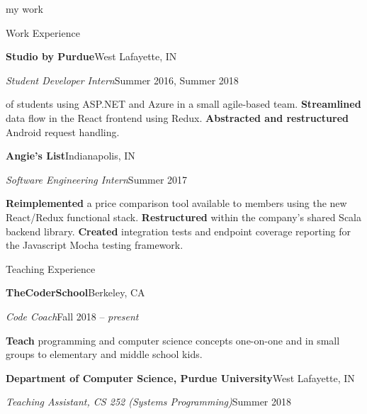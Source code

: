 \hfill\vrule\hfill{}
\begin{minipage}[t]{0.665\textwidth}
  {\Huge my work \phantom{me}}

  \vspace{10pt}

  {\sectionfont Work Experience}

  \vspace{5pt}
  \textbf{Studio by Purdue}\hfill West Lafayette, IN
  \begin{adjustwidth}{10pt}{}
    \emph{Student Developer Intern}\hfill Summer 2016, Summer 2018

     of students using ASP.NET and Azure in a small agile-based team.
    \textbf{Streamlined} data flow in the React frontend using Redux.
    \textbf{Abstracted and restructured} Android request handling.
  \end{adjustwidth}

  \vspace{5pt}
  \textbf{Angie's List}\hfill Indianapolis, IN
  \begin{adjustwidth}{10pt}{}
    \emph{Software Engineering Intern}\hfill Summer 2017

    \textbf{Reimplemented} a price comparison tool available to members using the new React/Redux functional stack.
    \textbf{Restructured}  within the company's shared Scala backend library.
    \textbf{Created} integration tests and endpoint coverage reporting for the Javascript Mocha testing framework.
  \end{adjustwidth}

  \vspace{10pt}

  {\sectionfont Teaching Experience}

  \vspace{5pt}
  \textbf{TheCoderSchool}\hfill Berkeley, CA
  \begin{adjustwidth}{10pt}{}
    \emph{Code Coach}\hfill Fall 2018 -- \emph{present}

    \textbf{Teach} programming and computer science concepts one-on-one and in small groups to elementary and middle school kids.
  \end{adjustwidth}

  \vspace{5pt}
  \textbf{Department of Computer Science, Purdue University}\hfill West Lafayette, IN
  \begin{adjustwidth}{10pt}{}
    \emph{Teaching Assistant, CS 252 (Systems Programming)}\hfill Summer 2018


\end{adjustwidth}
\end{minipage}
